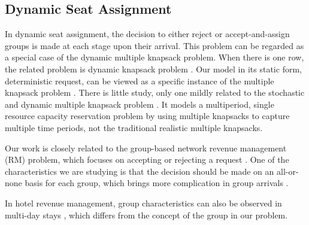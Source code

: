 
\subsection{Dynamic Seat Assignment}






In dynamic seat assignment, the decision to either reject or accept-and-assign groups is made at each stage upon their arrival. This problem can be regarded as a special case of the dynamic multiple knapsack problem. When there is one row, the related problem is dynamic knapsack problem \cite{kleywegt1998dynamic}. Our model in its static form, deterministic request, can be viewed as a specific instance of the multiple knapsack problem \cite{pisinger1999exact}. There is little study, only one mildly related to the stochastic and dynamic multiple knapsack problem \cite{perry2009approximate}. It models a multiperiod, single resource capacity reservation problem by using multiple knapsacks to capture multiple time periods, not the traditional realistic multiple knapsacks.



Our work is closely related to the group-based network revenue management (RM) problem, which focuses on accepting or rejecting a request \cite{gallego1997multiproduct}. One of the characteristics we are studying is that the decision should be made on an all-or-none basis for each group, which brings more complication in group arrivals \cite{talluri2006theory}. 

In hotel revenue management, group characteristics can also be observed in multi-day stays \cite{aydin2018decomposition, bitran1995application}, which differs from the concept of the group in our problem.

